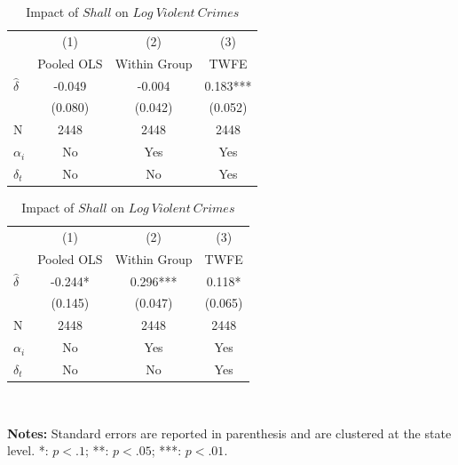 \documentclass{article}
\begin{document}
\begin{center}
    \begin{table}[hbtp!]
\parbox{.45\linewidth}{
\centering
\caption{Impact of $Shall$ on $Log~Property~Crimes$}
\begin{tabular}{l|c|c|c|}
                      & (1)     & (2)     & (3)     \\  & Pooled OLS     &  Within Group     & TWFE        \\ \hline
$\widehat{\delta}$  & -0.049 & -0.004 & 0.183***  \\
\multicolumn{1}{c|}{} & (0.080) & (0.042)  & (0.052) \\ \hline
N                        & 2448    & 2448     & 2448        \\
$\alpha_i$                 & No       & Yes        & Yes             \\
$\delta_t$                  & No       & No        & Yes         \\
\hline   
\end{tabular}
}
\hfill
\parbox{.45\linewidth}{
\centering
\caption{Impact of $Shall$ on $Log~Violent~Crimes$}
\begin{tabular}{l|c|c|c|}
                      & (1)     & (2)     & (3)         \\  & Pooled OLS     &  Within Group    & TWFE         \\ \hline
$\widehat{\delta}$                 & -0.244* & 0.296*** & 0.118* \\
\multicolumn{1}{c|}{} & (0.145) & (0.047)  & (0.065)   \\ \hline
N                      & 2448    & 2448     & 2448        \\
$\alpha_i$                    & No       & Yes        & Yes            \\
$\delta_t$                 & No       & No        & Yes         
 \\\hline   
\end{tabular}
}\\[.5 em]
\begin{minipage}{\textwidth} %
\footnotesize{\textbf{Notes:} Standard errors are reported in parenthesis and are clustered at the state level. *: $p<.1$; **: $p<.05$; ***: $p<.01$.\par}
\end{minipage}

\end{table}
\end{center}
\end{document}
